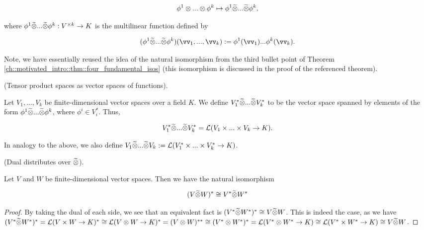 \begin{deriv}
    \begin{align*}
        \phi^1 \otimes ... \otimes \phi^k \mapsto \phi^1 \widetilde{\otimes} ... \widetilde{\otimes} \phi^k,
    \end{align*}
    
    where $\phi^1 \widetilde{\otimes} ... \widetilde{\otimes} \phi^k:V^{\times k} \rightarrow K$ is the multilinear function defined by
    
    \begin{align*}
        (\phi^1 \totimes ... \totimes \phi^k)(\vv_1, ..., \vv_k) := \phi^1(\vv_1) ... \phi^k(\vv_k).
    \end{align*}
    
    Note, we have essentially reused the idea of the natural isomorphism from the third bullet point of Theorem \ref{ch::motivated_intro::thm::four_fundamental_isos} (this isomorphism is discussed in the proof of the referenced theorem).
\end{deriv}

\begin{defn}
    (Tensor product spaces as vector spaces of functions).
    
    Let $V_1, ..., V_k$ be finite-dimensional vector spaces over a field $K$. We define $V_1^* \widetilde{\otimes} ... \widetilde{\otimes} V_k^*$ to be the vector space spanned by elements of the form $\phi^1 \widetilde{\otimes} ... \widetilde{\otimes} \phi^k$, where $\phi^i \in V_i^*$. Thus, 
    
    \begin{align*}
        V_1^* \widetilde{\otimes} ... \widetilde{\otimes} V_k^* = \mathcal{L}(V_1 \times ... \times V_k \rightarrow K).
    \end{align*}
    
    In analogy to the above, we also define $V_1 \widetilde{\otimes} ... \widetilde{\otimes} V_k := \mathcal{L}(V_1^* \times ... \times V_k^* \rightarrow K)$.
\end{defn}

\begin{theorem}
    (Dual distributes over $\widetilde{\otimes}$).
    
    Let $V$ and $W$ be finite-dimensional vector spaces. Then we have the natural isomorphism
    
    \begin{align*}
        (V \widetilde{\otimes} W)^* \cong
        V^* \widetilde{\otimes} W^*
    \end{align*}
\end{theorem}

\begin{proof}
    By taking the dual of each side, we see that an equivalent fact is $(V^* \widetilde{\otimes} W^*)^* \cong V \widetilde{\otimes} W$. This is indeed the case, as we have $(V^* \widetilde{\otimes} W^*)^* = \mathcal{L}(V \times W \rightarrow K)^* \cong \mathcal{L}(V \otimes W \rightarrow K)^* = (V \otimes W)^{**} \cong (V^* \otimes W^*)^* = \mathcal{L}(V^* \otimes W^* \rightarrow K) \cong \mathcal{L}(V^* \times W^* \rightarrow K) \cong V \widetilde{\otimes} W$.

        
\end{proof}


